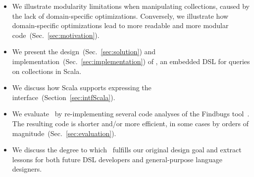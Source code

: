 \begin{itemize}
\item We illustrate modularity limitations when manipulating collections, caused by the lack of domain-specific optimizations. Conversely, we illustrate how domain-specific optimizations lead to more readable and more modular code~(Sec.~\ref{sec:motivation}).
\item We present the design~(Sec.~\ref{sec:solution}) and implementation~(Sec.~\ref{sec:implementation}) of \LoS, an embedded DSL for queries on collections in Scala.
\item We discuss how Scala supports expressing the interface~(Section~\ref{sec:intfScala}).
 \item We evaluate \LoS\ by re-implementing several code analyses of the Findbugs tool~\citep{DBLP:journals/sigplan/HovemeyerP04}.
 The resulting code is shorter and/or more efficient, in some cases by orders of magnitude~(Sec.~\ref{sec:evaluation}).
 \item We discuss the degree to which \LoS\ fulfills our original design goal and extract lessons for
 both future DSL developers and general-purpose language designers. %
\end{itemize}


